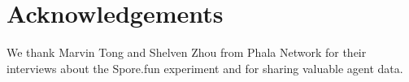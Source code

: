 \documentclass[letterpaper]{article}
\begin{document}




\section{Acknowledgements}
We thank Marvin Tong and Shelven Zhou from Phala Network for their interviews about the Spore.fun experiment and for sharing valuable agent data. 

\footnotesize

\end{document}

